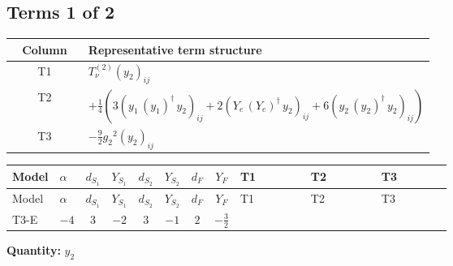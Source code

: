 \documentclass[8pt]{article}
\begin{document}
\begin{landscape}
\subsection*{Terms 1 of 2}
\begin{center}
\begin{tabular}{@{}c >{\raggedright\arraybackslash}p{0.82\linewidth}@{}}
\toprule
Column & Representative term structure \\
\midrule
T1 & \(\displaystyle T_{\nu}^{(2)} \left({y_2}\right)_{ij}\) \\
\midrule
T2 & \(\displaystyle +\frac{1}{4} (3 \left({y_1}\,\left({y_1}\right)^{\dagger}\,{y_2}\right)_{ij}+2 \left({Y_e}\,\left({Y_e}\right)^{\dagger}\,{y_2}\right)_{ij}+6 \left({y_2}\,\left({y_2}\right)^{\dagger}\,{y_2}\right)_{ij})\) \\
\midrule
T3 & \(\displaystyle -\frac{9}{2} {g_2}^2 \left({y_2}\right)_{ij}\) \\
\midrule
\bottomrule
\end{tabular}
\end{center}
\smallskip
\tiny
\begin{longtable}{@{}llcccccc >{\raggedright\arraybackslash}p{0.21\linewidth} >{\raggedright\arraybackslash}p{0.21\linewidth} >{\raggedright\arraybackslash}p{0.21\linewidth}@{}}
\toprule
Model & $\alpha$ & $d_{S_1}$ & $Y_{S_1}$ & $d_{S_2}$ & $Y_{S_2}$ & $d_F$ & $Y_F$ & T1 & T2 & T3 \\
\midrule
\endfirsthead
\toprule
Model & $\alpha$ & $d_{S_1}$ & $Y_{S_1}$ & $d_{S_2}$ & $Y_{S_2}$ & $d_F$ & $Y_F$ & T1 & T2 & T3 \\
\midrule
\endhead
T3-E & $-4$ & $3$ & $-2$ & $3$ & $-1$ & $2$ & $-\frac{3}{2}$ & \scriptsize\adjustbox{max width=\linewidth}{$\begin{gathered} T_{\nu}^{(2)} \left({y_2}\right)_{ij}\end{gathered}$} & \scriptsize\adjustbox{max width=\linewidth}{$\begin{gathered} +\frac{1}{4} (3 \left({y_1}\,\left({y_1}\right)^{\dagger}\,{y_2}\right)_{ij}+2 \left({Y_e}\,\left({Y_e}\right)^{\dagger}\,{y_2}\right)_{ij}+6 \left({y_2}\,\left({y_2}\right)^{\dagger}\,{y_2}\right)_{ij})\end{gathered}$} & \scriptsize\adjustbox{max width=\linewidth}{$\begin{gathered} -\frac{9}{2} {g_2}^2 \left({y_2}\right)_{ij}\end{gathered}$} \\
\midrule
\bottomrule
\end{longtable}
\clearpage
\noindent\textbf{Quantity: }$y_2$\par\smallskip

\end{landscape}
\end{document}
